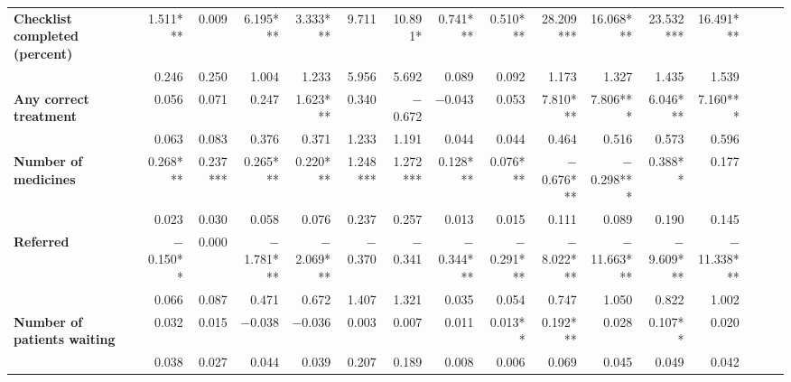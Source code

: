 \begin{tabular}{@{\extracolsep{5pt}}lrrrrrrrrrrrrrrr}
{\bf Checklist completed (percent)} & 1.511*** & 0.009\phantom{***} & 6.195*** & 3.333*** & 9.711\phantom{***} & 10.891*\phantom{**} & 0.741*** & 0.510*** & 28.209*** & 16.068*** & 23.532*** & 16.491*** \\
{\bf } & 0.246\phantom{***} & 0.250\phantom{***} & 1.004\phantom{***} & 1.233\phantom{***} & 5.956\phantom{***} & 5.692\phantom{***} & 0.089\phantom{***} & 0.092\phantom{***} & 1.173\phantom{***} & 1.327\phantom{***} & 1.435\phantom{***} & 1.539\phantom{***} \\
{\bf Any correct treatment} & 0.056\phantom{***} & 0.071\phantom{***} & 0.247\phantom{***} & 1.623*** & 0.340\phantom{***} & $-$0.672\phantom{***} & $-$0.043\phantom{***} & 0.053\phantom{***} & 7.810*** & 7.806*** & 6.046*** & 7.160*** \\
{\bf } & 0.063\phantom{***} & 0.083\phantom{***} & 0.376\phantom{***} & 0.371\phantom{***} & 1.233\phantom{***} & 1.191\phantom{***} & 0.044\phantom{***} & 0.044\phantom{***} & 0.464\phantom{***} & 0.516\phantom{***} & 0.573\phantom{***} & 0.596\phantom{***} \\
{\bf Number of medicines} & 0.268*** & 0.237*** & 0.265*** & 0.220*** & 1.248*** & 1.272*** & 0.128*** & 0.076*** & $-$0.676*** & $-$0.298*** & 0.388**\phantom{*} & 0.177\phantom{***} \\
{\bf } & 0.023\phantom{***} & 0.030\phantom{***} & 0.058\phantom{***} & 0.076\phantom{***} & 0.237\phantom{***} & 0.257\phantom{***} & 0.013\phantom{***} & 0.015\phantom{***} & 0.111\phantom{***} & 0.089\phantom{***} & 0.190\phantom{***} & 0.145\phantom{***} \\
{\bf Referred} & $-$0.150**\phantom{*} & 0.000\phantom{***} & $-$1.781*** & $-$2.069*** & $-$0.370\phantom{***} & $-$0.341\phantom{***} & $-$0.344*** & $-$0.291*** & $-$8.022*** & $-$11.663*** & $-$9.609*** & $-$11.338*** \\
{\bf } & 0.066\phantom{***} & 0.087\phantom{***} & 0.471\phantom{***} & 0.672\phantom{***} & 1.407\phantom{***} & 1.321\phantom{***} & 0.035\phantom{***} & 0.054\phantom{***} & 0.747\phantom{***} & 1.050\phantom{***} & 0.822\phantom{***} & 1.002\phantom{***} \\
{\bf Number of patients waiting} & 0.032\phantom{***} & 0.015\phantom{***} & $-$0.038\phantom{***} & $-$0.036\phantom{***} & 0.003\phantom{***} & 0.007\phantom{***} & 0.011\phantom{***} & 0.013**\phantom{*} & 0.192*** & 0.028\phantom{***} & 0.107**\phantom{*} & 0.020\phantom{***} \\
{\bf } & 0.038\phantom{***} & 0.027\phantom{***} & 0.044\phantom{***} & 0.039\phantom{***} & 0.207\phantom{***} & 0.189\phantom{***} & 0.008\phantom{***} & 0.006\phantom{***} & 0.069\phantom{***} & 0.045\phantom{***} & 0.049\phantom{***} & 0.042\phantom{***} \\

\end{tabular}
